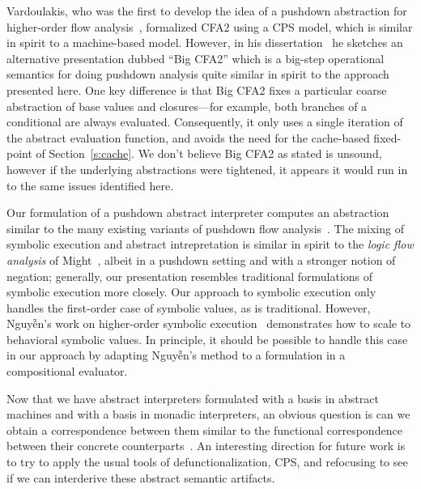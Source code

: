 Vardoulakis, who was the first to develop the idea of a pushdown abstraction
for higher-order flow analysis~\cite{dvanhorn:Vardoulakis2011CFA2}, formalized
CFA2 using a CPS model, which is similar in spirit to a machine-based model.
However, in his dissertation~\cite{local:vardoulakis-diss12} he sketches an
alternative presentation dubbed ``Big CFA2'' which is a big-step operational
semantics for doing pushdown analysis quite similar in spirit to the approach
presented here.  One key difference is that Big CFA2 fixes a particular coarse
abstraction of base values and closures---for example, both branches of a
conditional are always evaluated.  Consequently, it only uses a single
iteration of the abstract evaluation function, and avoids the need for the
cache-based fixed-point of Section~\ref{s:cache}.  We don't believe Big CFA2 as
stated is unsound, however if the underlying abstractions were tightened, it
appears it would run in to the same issues identified here.

Our formulation of a pushdown abstract interpreter computes an abstraction
similar to the many existing variants of pushdown flow analysis~\cite%
{dvanhorn:Vardoulakis2011CFA2%
,dvanhorn:Earl2010Pushdown%
,local:vardoulakis-diss12%
,dvanhorn:VanHorn2012Systematic%
,dvanhorn:Earl2012Introspective%
,dvanhorn:Johnson2014Abstracting%
,dvanhorn:Johnson2014Pushdown%
,local:p4f%
}.
The mixing of symbolic execution and abstract intrepretation is similar in
spirit to the \emph{logic flow analysis} of Might~\cite{local:might-popl07},
albeit in a pushdown setting and with a stronger notion of negation; generally,
our presentation resembles traditional formulations of symbolic execution more
closely.  Our approach to symbolic execution only handles the first-order case
of symbolic values, as is traditional.  However, Nguyễn's work on higher-order
symbolic execution~\cite{dvanhorn:Nguyen2015Relatively} demonstrates how to
scale to behavioral symbolic values.  In principle, it should be possible to
handle this case in our approach by adapting Nguyễn's method to a formulation
in a compositional evaluator.

Now that we have abstract interpreters formulated with a basis in abstract
machines and with a basis in monadic interpreters, an obvious question is can
we obtain a correspondence between them similar to the functional
correspondence between their concrete
counterparts~\cite{dvanhorn:Ager2005Functional}.  An interesting direction for
future work is to try to apply the usual tools of defunctionalization, CPS, and
refocusing to see if we can interderive these abstract semantic artifacts.
